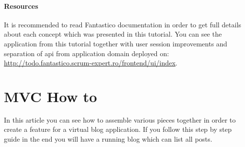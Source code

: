 \documentclass[letterpaper,10pt,english]{sphinxmanual}
\begin{document}
\paragraph{Resources}
\label{how_to/todo/step_5_final_notes:resources}
It is recommended to read Fantastico documentation in order to get full details about each concept which was presented in this
tutorial. You can see the application from this tutorial together with user session improvements
and separation of api from application domain deployed on: \href{http://todo.fantastico.scrum-expert.ro/frontend/ui/index}{http://todo.fantastico.scrum-expert.ro/frontend/ui/index}.


\section{MVC How to}
\label{how_to/mvc_how_to::doc}\label{how_to/mvc_how_to:mvc-how-to}
In this article you can see how to assemble various pieces together in order to create a feature for a virtual blog application.
If you follow this step by step guide in the end you will have a running blog which can list all posts.
\end{document}
